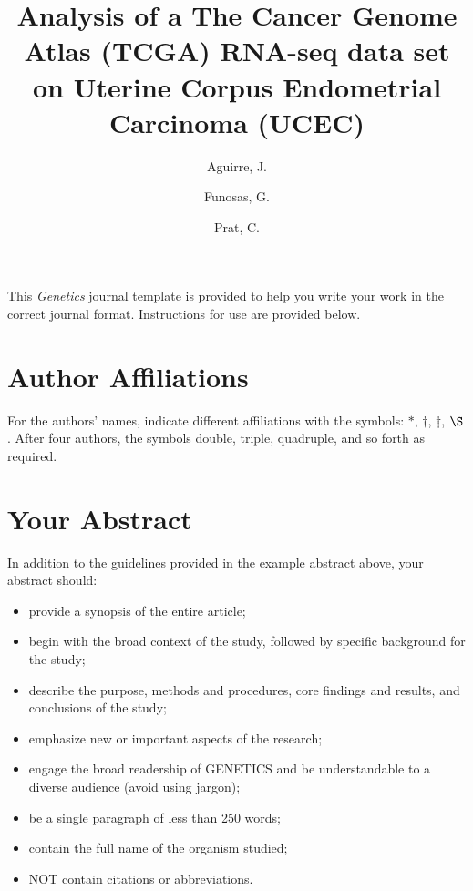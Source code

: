 \documentclass[9pt,twocolumn,twoside]{gsajnl}
\title{Analysis of a The Cancer Genome Atlas (TCGA) RNA-seq data set on Uterine Corpus Endometrial Carcinoma (UCEC)}
\author[$\ast$]{Aguirre, J.}
\author[$\ast$]{Funosas, G.}
\author[$\ast$]{Prat, C.}
\affil[$\ast$]{University Pompeu Fabra}
\begin{document}
\maketitle
\thispagestyle{firststyle}
\marginmark
\firstpagefootnote
{}
\vspace{-11pt}%

\lettrine[lines=2]{\color{color2}T}{}his \textit{Genetics} journal template is provided to help you write your work in the correct journal format. Instructions for use are provided below. 


\section*{Author Affiliations}

For the authors' names, indicate different affiliations with the symbols: $\ast$, $\dagger$, $\ddagger$, $\S$. After four authors, the symbols double, triple, quadruple, and so forth as required.

\section*{Your Abstract}

In addition to the guidelines provided in the example abstract above, your abstract should:

\begin{itemize}
\item provide a synopsis of the entire article;
\item begin with the broad context of the study, followed by specific background for the study;
\item describe the purpose, methods and procedures, core findings and results, and conclusions of the study;
\item emphasize new or important aspects of the research;
\item engage the broad readership of GENETICS and be understandable to a diverse audience (avoid using jargon);
\item be a single paragraph of less than 250 words;
\item contain the full name of the organism studied;
\item NOT contain citations or abbreviations.
\end{itemize}
\end{document}
